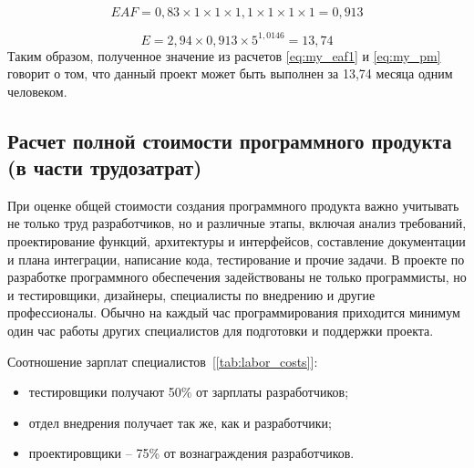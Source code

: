 \begin{equation}\label{eq:my_eaf1}
	EAF = 0{,}83 \times 1 \times 1 \times 1{,}1 \times 1 \times 1 \times 1 = 0{,}913
\end{equation}

\begin{equation}\label{eq:my_pm}
	E = 2{,}94 \times 0{,}913 \times 5 ^ {1{,}0146} = 13{,}74
\end{equation}
Таким образом, полученное значение из расчетов \ref{eq:my_eaf1} и \ref{eq:my_pm} говорит о том, что данный проект может быть выполнен за 13,74 месяца одним человеком.

\subsection{Расчет полной стоимости программного продукта (в части трудозатрат)}

При оценке общей стоимости создания программного продукта важно учитывать не только труд разработчиков, но и различные этапы, включая анализ требований, проектирование функций, архитектуры и интерфейсов, составление документации и плана интеграции, написание кода, тестирование и прочие задачи. В проекте по разработке программного обеспечения задействованы не только программисты, но и тестировщики, дизайнеры, специалисты по внедрению и другие профессионалы. Обычно на каждый час программирования приходится минимум один час работы других специалистов для подготовки и поддержки проекта.

Соотношение зарплат специалистов~[\ref{tab:labor_costs}]:
\begin{itemize}
	\item тестировщики получают 50\% от зарплаты разработчиков;
	\item отдел внедрения получает так же, как и разработчики;
	\item проектировщики – 75\% от вознаграждения разработчиков.
\end{itemize}

